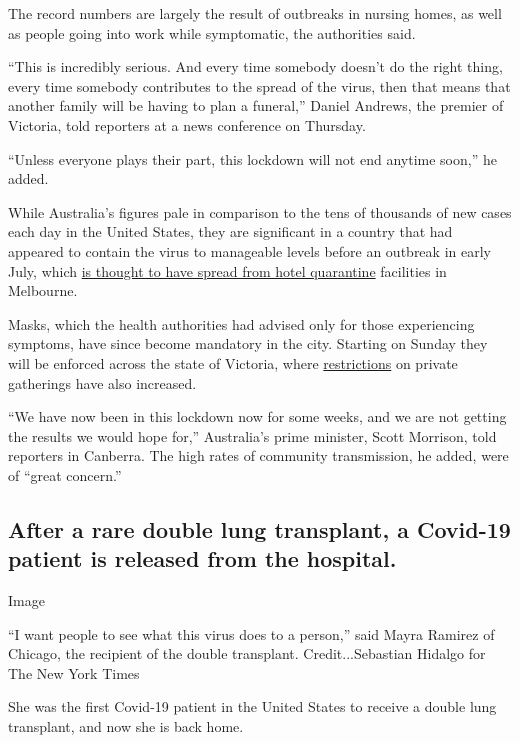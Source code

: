 The record numbers are largely the result of outbreaks in nursing homes,
as well as people going into work while symptomatic, the authorities
said.

``This is incredibly serious. And every time somebody doesn't do the
right thing, every time somebody contributes to the spread of the virus,
then that means that another family will be having to plan a funeral,''
Daniel Andrews, the premier of Victoria, told reporters at a news
conference on Thursday.

``Unless everyone plays their part, this lockdown will not end anytime
soon,'' he added.

While Australia's figures pale in comparison to the tens of thousands of
new cases each day in the United States, they are significant in a
country that had appeared to contain the virus to manageable levels
before an outbreak in early July, which
\href{https://www.nytimes.com/2020/07/02/world/australia/melbourne-coronavirus-outbreak.html}{is
thought to have spread from hotel quarantine} facilities in Melbourne.

Masks, which the health authorities had advised only for those
experiencing symptoms, have since become mandatory in the city. Starting
on Sunday they will be enforced across the state of Victoria, where
\href{https://www.nytimes.com/2020/07/17/world/australia/melbourne-lockdown-readers.html}{restrictions}
on private gatherings have also increased.

``We have now been in this lockdown now for some weeks, and we are not
getting the results we would hope for,'' Australia's prime minister,
Scott Morrison, told reporters in Canberra. The high rates of community
transmission, he added, were of ``great concern.''

\hypertarget{after-a-rare-double-lung-transplant-a-covid-19-patient-is-released-from-the-hospital}{%
\subsection{After a rare double lung transplant, a Covid-19 patient is
released from the
hospital.}\label{after-a-rare-double-lung-transplant-a-covid-19-patient-is-released-from-the-hospital}}

Image

``I want people to see what this virus does to a person,'' said Mayra
Ramirez of Chicago, the recipient of the double transplant.
Credit...Sebastian Hidalgo for The New York Times

She was the first Covid-19 patient in the United States to receive a
double lung transplant, and now she is back home.

